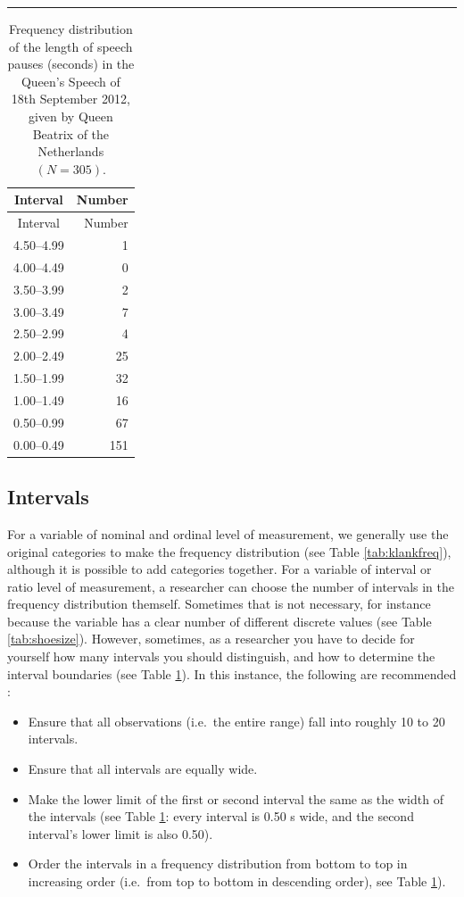 \documentclass[
]{book}
\begin{document}
\begin{center}\rule{0.5\linewidth}{0.5pt}\end{center}

\begin{longtable}[]{@{}cr@{}}
\caption{\label{tab:queensspeech2012pauses} Frequency distribution of the length of speech pauses (seconds)
in the Queen's Speech of 18th September 2012, given by Queen Beatrix of the Netherlands
\((N=305)\).}\tabularnewline
\toprule
Interval & Number\tabularnewline
\midrule
\endfirsthead
\toprule
Interval & Number\tabularnewline
\midrule
\endhead
4.50--4.99 & 1\tabularnewline
4.00--4.49 & 0\tabularnewline
3.50--3.99 & 2\tabularnewline
3.00--3.49 & 7\tabularnewline
2.50--2.99 & 4\tabularnewline
2.00--2.49 & 25\tabularnewline
1.50--1.99 & 32\tabularnewline
1.00--1.49 & 16\tabularnewline
0.50--0.99 & 67\tabularnewline
0.00--0.49 & 151\tabularnewline
\bottomrule
\end{longtable}

\hypertarget{sec:intervals}{%
\subsection{Intervals}\label{sec:intervals}}

For a variable of nominal and ordinal level of measurement, we generally
use the original categories to make the frequency distribution
(see Table \ref{tab:klankfreq}), although it is possible to add categories
together. For a variable of interval or ratio level of measurement, a
researcher can choose the number of intervals in the frequency distribution
themself. Sometimes that is not necessary, for instance because the variable has
a clear number of different discrete values (see Table \ref{tab:shoesize}).
However, sometimes, as a researcher you have to decide for yourself how many
intervals you should distinguish, and how to determine the
interval boundaries (see Table \ref{tab:queensspeech2012pauses}).
In this instance, the following are recommended \citep[Ch.2]{Ferg89}:

\begin{itemize}
\item
  Ensure that all observations (i.e.~the entire range) fall into
  roughly 10 to 20 intervals.
\item
  Ensure that all intervals are equally wide.
\item
  Make the lower limit of the first or second interval the same as
  the width of the intervals (see
  Table \ref{tab:queensspeech2012pauses}: every interval is 0.50 s
  wide, and the second interval's lower limit is also 0.50).
\item
  Order the intervals in a frequency distribution from bottom
  to top in increasing order (i.e.~from top to bottom in
  descending order), see
  Table \ref{tab:queensspeech2012pauses}).
\end{itemize}
\end{document}
